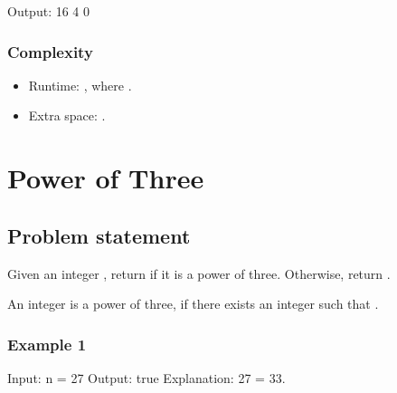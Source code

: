 \documentclass[letterpaper,12pt,english]{book}
\begin{document}
\begin{sphinxVerbatim}[commandchars=\\\{\}]
Output:
16
4
0
\end{sphinxVerbatim}


\subsubsection{Complexity}
\label{\detokenize{Mathematics/09_MTH_318_Maximum_Product_of_Word_Lengths:id2}}\begin{itemize}
\item {} 
\sphinxAtStartPar
Runtime: , where .

\item {} 
\sphinxAtStartPar
Extra space: .

\end{itemize}

\sphinxstepscope


\section{Power of Three}
\label{\detokenize{Mathematics/09_MTH_326_Power_of_Three:power-of-three}}\label{\detokenize{Mathematics/09_MTH_326_Power_of_Three::doc}}

\subsection{Problem statement\sphinxfootnotemark[124]}
\label{\detokenize{Mathematics/09_MTH_326_Power_of_Three:problem-statement}}%
\begin{footnotetext}[124]\sphinxAtStartFootnote
{}
%
\end{footnotetext}\ignorespaces 
\sphinxAtStartPar
Given an integer , return  if it is a power of three. Otherwise, return .

\sphinxAtStartPar
An integer  is a power of three, if there exists an integer  such that .


\subsubsection{Example 1}
\label{\detokenize{Mathematics/09_MTH_326_Power_of_Three:example-1}}
\begin{sphinxVerbatim}[commandchars=\\\{\}]
Input: n = 27
Output: true
Explanation: 27 = 3\PYGZca{}3.
\end{sphinxVerbatim}
\end{document}
